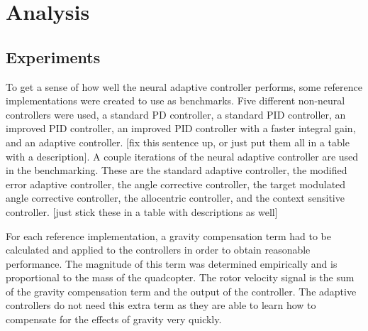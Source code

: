 \documentclass[letterpaper,12pt,titlepage,oneside,final]{book}
\begin{document}
\chapter{Analysis}

\section{Experiments}


To get a sense of how well the neural adaptive controller performs, some reference implementations were created to use as benchmarks. 
Five different non-neural controllers were used, a standard PD controller, a standard PID controller, an improved PID controller, an improved PID controller with a faster integral gain, and an adaptive controller. [fix this sentence up, or just put them all in a table with a description]. 
A couple iterations of the neural adaptive controller are used in the benchmarking. 
These are the standard adaptive controller, the modified error adaptive controller, the angle corrective controller, the target modulated angle corrective controller, the allocentric controller, and the context sensitive controller. [just stick these in a table with descriptions as well]


For each reference implementation, a gravity compensation term had to be calculated and applied to the controllers in order to obtain reasonable performance. 
The magnitude of this term was determined empirically and is proportional to the mass of the quadcopter. 
The rotor velocity signal is the sum of the gravity compensation term and the output of the controller.
The adaptive controllers do not need this extra term as they are able to learn how to compensate for the effects of gravity very quickly.
\end{document}
